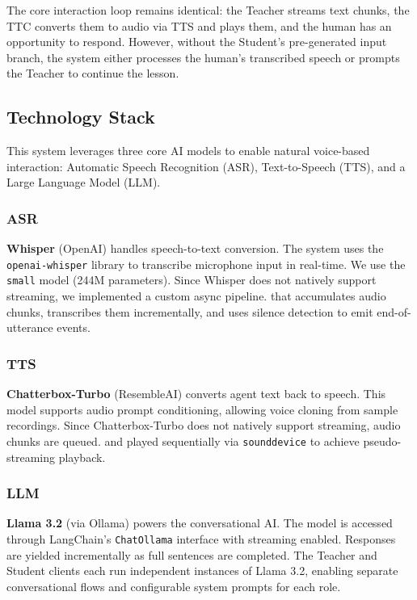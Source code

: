 The core interaction loop remains identical: the Teacher streams text chunks, the TTC converts them to audio via TTS and plays them, and the human has an opportunity to respond. However, without the Student's pre-generated input branch, the system either processes the human's transcribed speech or prompts the Teacher to continue the lesson.

\subsection{Technology Stack}

This system leverages three core AI models to enable natural voice-based interaction: Automatic Speech Recognition (ASR), Text-to-Speech (TTS), and a Large Language Model (LLM).

\subsubsection{ASR}
\textbf{Whisper} (OpenAI) handles speech-to-text conversion. The system uses the \texttt{openai-whisper} library to transcribe microphone input in real-time. We use the \texttt{small} model (244M parameters). Since Whisper does not natively support streaming, we implemented a custom async pipeline. that accumulates audio chunks, transcribes them incrementally, and uses silence detection to emit end-of-utterance events.
\subsubsection{TTS}
\textbf{Chatterbox-Turbo} (ResembleAI) converts agent text back to speech. This model supports audio prompt conditioning, allowing voice cloning from sample recordings. Since Chatterbox-Turbo does not natively support streaming, audio chunks are queued. and played sequentially via \texttt{sounddevice} to achieve pseudo-streaming playback.

\subsubsection{LLM}
\textbf{Llama 3.2} (via Ollama) powers the conversational AI. The model is accessed through LangChain's \texttt{ChatOllama} interface with streaming enabled. Responses are yielded incrementally as full sentences are completed. The Teacher and Student clients each run independent instances of Llama 3.2, enabling separate conversational flows and configurable system prompts for each role.

